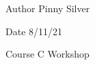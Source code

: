 \begin{DoxyAuthor}{Author}
Pinny Silver 
\end{DoxyAuthor}
\begin{DoxyDate}{Date}
8/11/21 
\end{DoxyDate}
\begin{DoxyParagraph}{Course}
C Workshop 
\end{DoxyParagraph}

